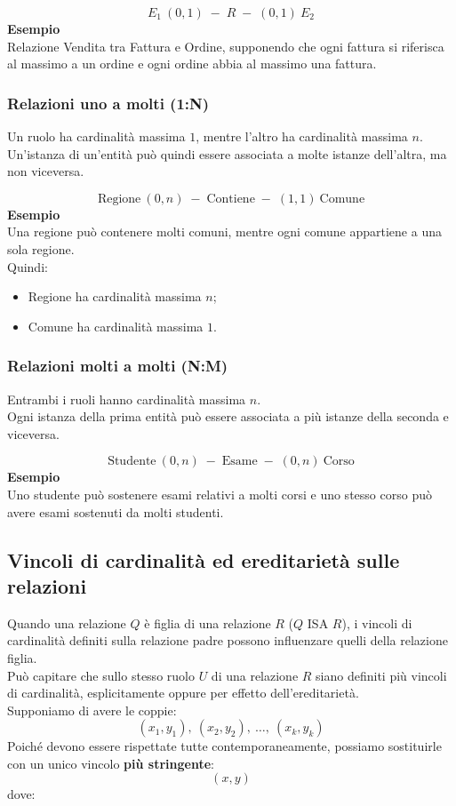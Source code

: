 \[
\boxed{E_1\ (0,1)\;-\;R\;-\;(0,1)\ E_2}
\]
\textcolor{verdeEsempio}{\textbf{Esempio}}\\
Relazione Vendita tra Fattura e Ordine,
supponendo che ogni fattura si riferisca al massimo
a un ordine e ogni ordine abbia al massimo una fattura.

\subsubsection*{Relazioni uno a molti (1:N)}

Un ruolo ha cardinalità massima $1$, mentre l'altro
ha cardinalità massima $n$.\\
Un'istanza di un'entità può quindi essere associata
a molte istanze dell'altra, ma non viceversa.

\[
\boxed{\text{Regione}\ (0,n)\;-\;\text{Contiene}
\;-\;(1,1)\ \text{Comune}}
\]
\textcolor{verdeEsempio}{\textbf{Esempio}}\\
Una regione può contenere molti comuni, mentre
ogni comune appartiene a una sola regione.\\
Quindi:
\begin{itemize}
    \item Regione ha cardinalità massima $n$;
    \item Comune ha cardinalità massima $1$.
\end{itemize}

\subsubsection*{Relazioni molti a molti (N:M)}

Entrambi i ruoli hanno cardinalità massima $n$.\\
Ogni istanza della prima entità può essere associata
a più istanze della seconda e viceversa.

\[
\boxed{\text{Studente}\ (0,n)\;-\;\text{Esame}
\;-\;(0,n)\ \text{Corso}}
\]
\textcolor{verdeEsempio}{\textbf{Esempio}}\\
Uno studente può sostenere esami relativi a molti corsi
e uno stesso corso può avere esami sostenuti
da molti studenti.

\subsection{Vincoli di cardinalità ed ereditarietà sulle relazioni}
Quando una relazione $Q$ è figlia di una relazione $R$
($Q$ ISA $R$), i vincoli di cardinalità definiti sulla
relazione padre possono influenzare quelli della relazione figlia.\medskip\\
Può capitare che sullo stesso ruolo $U$ di una relazione $R$
siano definiti più vincoli di cardinalità, esplicitamente
oppure per effetto dell'ereditarietà.\\
Supponiamo di avere le coppie:
\[
(x_1,y_1),\ (x_2,y_2),\ \ldots,\ (x_k,y_k)
\]
Poiché devono essere rispettate tutte contemporaneamente,
possiamo sostituirle con un unico vincolo
\textbf{più stringente}:
\[
\boxed{(x,y)}
\]
dove:

